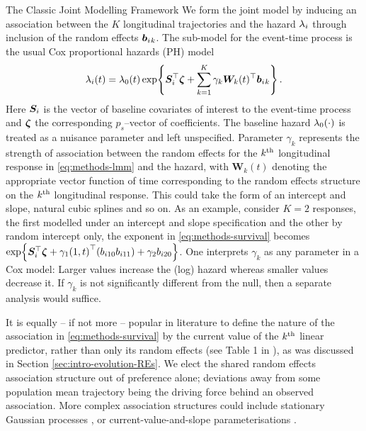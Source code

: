 \begin{chapter}{\label{cha:methods-classic}The Classic Joint Modelling Framework}
  We form the joint model by inducing an association between the $K$ longitudinal trajectories and the hazard $\lambda_i$ through inclusion of the random effects $\bm{b}_i{_k}$. The sub-model for the event-time process is the usual Cox proportional hazards (PH) model
  \begin{align}
       \lambda_i(t)=\lambda_0(t)\exp\!\left\{\bm{S}_i^\top\bm{\zeta} + \sum_{k=1}^K\gamma_k\bm{W}_k(t)^\top\bm{b}_i{_k}\right\}.
  \label{eq:methods-survival}
  \end{align}
  Here $\bm{S}_i$ is the vector of baseline covariates of interest to the event-time process and $\bm{\zeta}$ the corresponding $p_s$--vector of coefficients. The baseline hazard $\lambda_0(\cdot)$ is treated as a nuisance parameter and left unspecified. Parameter $\gamma_k$ represents the strength of association between the random effects for the $k^{\text{th}}$ longitudinal response in \eqref{eq:methods-lmm} and the hazard, with $\bm{W}_k(t)$ denoting the appropriate vector function of time corresponding to the random effects structure on the $k^{\text{th}}$ longitudinal response. This could take the form of an intercept and slope, natural cubic splines and so on. As an example, consider $K=2$ responses, the first modelled under an intercept and slope specification and the other by random intercept only, the exponent in \eqref{eq:methods-survival} becomes $\exp\!\left\{\bm{S}_i^\top\bm{\zeta} + \gamma_1\!\left(1, t\right)^\top\!\left( b_{i10} b_{i11}\right) + \gamma_2b_{i20}\right\}$. One interprets $\gamma_k$ as any parameter in a Cox model: Larger values increase the (log) hazard whereas smaller values decrease it. If $\gamma_k$ is not significantly different from the null, then a separate analysis would suffice.  

  It is equally -- if not more -- popular in literature to define the nature of the association in \eqref{eq:methods-survival} by the current value of the $k^{\text{th}}$ linear predictor, rather than only its random effects (see \eg Table 1 in \citet{Hickey2016}), as was discussed in Section \ref{sec:intro-evolution-REs}. We elect the shared random effects association structure out of preference alone; deviations away from some population mean trajectory being the driving force behind an observed association. More complex association structures could include stationary Gaussian processes \citep{Henderson2000, Martins2022}, or current-value-and-slope parameterisations \citep{Rizopoulos2011B, Rustand2023}. 
  

\end{chapter}
